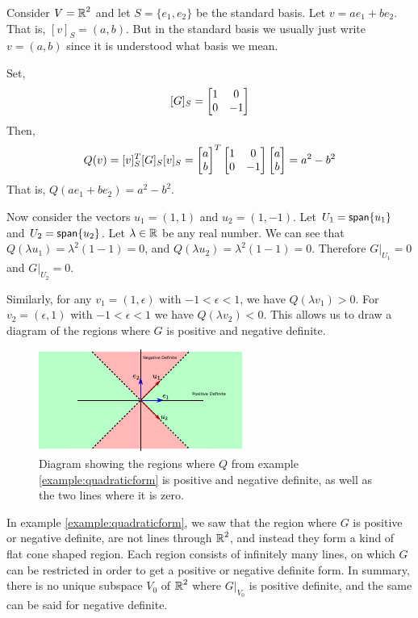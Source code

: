 \begin{example}
    Consider $V = \operatorname{\mathbb{R}}^2$ and let $S=\{e_1,e_2\}$ be the standard basis. Let $v = ae_1 + be_2$. That is, $[v]_S = (a,b)$. But in the standard basis we usually just write $v=(a,b)$ since it is understood what basis we mean. 
    
    Set,
    \[[G]_S= \begin{bmatrix}1&0\\0&-1\end{bmatrix}\]
    Then, 
    \[Q(v) = [v]_S^T [G]_S [v]_S = \begin{bmatrix}a\\b\end{bmatrix}^T\begin{bmatrix}1&0\\0&-1\end{bmatrix}\begin{bmatrix}a\\b\end{bmatrix} = a^2-b^2\]
    That is, $Q(ae_1+be_2) = a^2-b^2$. 

    Now consider the vectors $u_1 = (1,1)$ and $u_2 = (1,-1)$. Let $U_1 = \operatorname{\textsf{span}}\{u_1\}$ and $U_2 = \operatorname{\textsf{span}}\{u_2\}$. Let $\lambda \in \operatorname{\mathbb{R}}$ be any real number. We can see that $Q(\lambda u_1) = \lambda^2(1-1) = 0$, and $Q(\lambda u_2) = \lambda^2(1-1)=0$. Therefore $G|_{U_1}=0$ and $G|_{U_2}=0$. 

    Similarly, for any $v_1 = (1,\epsilon)$ with $-1<\epsilon < 1$, we have $Q(\lambda v_1) > 0$. For $v_2 = (\epsilon,1)$ with $-1<\epsilon<1$ we have $Q(\lambda v_2)<0$. This allows us to draw a diagram of the regions where $G$ is positive and negative definite.
    \label{example:quadraticform}
\end{example}
\begin{figure}[h]
        \centering
        \includegraphics[width=0.95\linewidth]{quadraticformr2.pdf}
        \caption{Diagram showing the regions where $Q$ from example \ref{example:quadraticform} is positive and negative definite, as well as the two lines where it is zero.}
        \label{fig:quadform}
\end{figure}
\begin{remark*}
    In example \ref{example:quadraticform}, we saw that the region where $G$ is positive or negative definite, are not lines through $\operatorname{\mathbb{R}}^2$, and instead they form a kind of flat cone shaped region. Each region consists of infinitely many lines, on which $G$ can be restricted in order to get a positive or negative definite form. In summary, there is no unique subspace $V_0$ of $\operatorname{\mathbb{R}}^2$ where $G|_{V_0}$ is positive definite, and the same can be said for negative definite.
\end{remark*}

